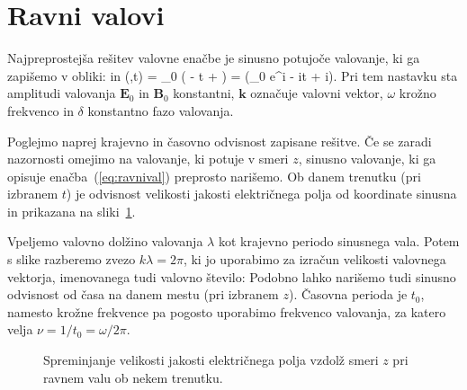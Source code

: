\section{Ravni valovi}
Najpreprostejša rešitev valovne enačbe je sinusno potujoče valovanje, ki ga zapišemo
v obliki:
in 
\beq
{}(,t) = _0 \cos \left(\cdot {} - \omega t + \delta\right) = 
\Re\left(_0 e^{i\cdot {} - i\omega t + i\delta}\right)\!\!.
\label{eq:ravnivalB}
\eeq
Pri tem nastavku sta amplitudi valovanja $\mathbf{E}_0$ in $\mathbf{B}_0$ konstantni, 
$\mathbf{k}$ označuje valovni vektor, 
$\omega$ krožno frekvenco in $\delta$ konstantno fazo
valovanja.

Poglejmo naprej krajevno in časovno odvisnost zapisane rešitve. Če se zaradi nazornosti 
omejimo na valovanje, ki potuje v smeri $z$, sinusno valovanje, ki ga opisuje 
enačba~(\ref{eq:ravnival}) preprosto narišemo. Ob danem trenutku (pri izbranem $t$) je odvisnost 
velikosti jakosti električnega polja od koordinate sinusna in prikazana na sliki~\ref{fig:03_sinus}.  

Vpeljemo valovno dolžino valovanja $\lambda$ kot krajevno periodo sinusnega vala. Potem s
slike razberemo zvezo $k\lambda = 2\pi$, ki jo uporabimo za izračun velikosti valovnega
vektorja, imenovanega tudi valovno število:
Podobno lahko narišemo tudi sinusno odvisnost od časa na danem mestu (pri izbranem $z$).
Časovna perioda je $t_0$, namesto krožne frekvence pa pogosto uporabimo frekvenco valovanja,
za katero velja $\nu = 1/t_0 = \omega/2\pi$. 
\begin{figure}[!h]
\centering
\def\svgwidth{90truemm} 

\caption{Spreminjanje velikosti jakosti električnega polja vzdolž smeri $z$ pri ravnem valu 
ob nekem trenutku.}
\label{fig:03_sinus}
\end{figure}

